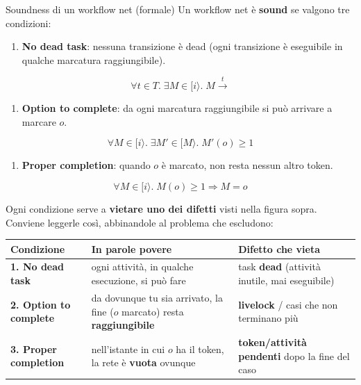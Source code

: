\begin{boxdefinition}{Soundness di un workflow net (formale)}
Un workflow net è \textbf{sound} se valgono tre condizioni:

\begin{enumerate}
\item \textbf{No dead task}: nessuna transizione è dead (ogni transizione è eseguibile in qualche marcatura raggiungibile).
\end{enumerate}

\[
\forall t \in T.\; \exists M \in [i\rangle.\; M \xrightarrow{t}
\]

\begin{enumerate}
\item \textbf{Option to complete}: da ogni marcatura raggiungibile si può arrivare a marcare $o$.
\end{enumerate}

\[
\forall M \in [i\rangle.\; \exists M' \in [M\rangle.\; M'(o) \ge 1
\]

\begin{enumerate}
\item \textbf{Proper completion}: quando $o$ è marcato, non resta nessun altro token.
\end{enumerate}

\[
\forall M \in [i\rangle.\; M(o) \ge 1 \Rightarrow M = o
\]
\end{boxdefinition}

Ogni condizione serve a \textbf{vietare uno dei difetti} visti nella figura sopra. Conviene leggerle così, abbinandole al problema che escludono:

\begingroup\small
\begin{tabularx}{\linewidth}{>{\raggedright\arraybackslash}X>{\raggedright\arraybackslash}X>{\raggedright\arraybackslash}X}
\toprule
\textbf{Condizione} & \textbf{In parole povere} & \textbf{Difetto che vieta} \\
\midrule
\textbf{1. No dead task} & ogni attività, in qualche esecuzione, si può fare & task \textbf{dead} (attività inutile, mai eseguibile) \\
\textbf{2. Option to complete} & da dovunque tu sia arrivato, la fine ($o$ marcato) resta \textbf{raggiungibile} & \textbf{livelock} / casi che non terminano più \\
\textbf{3. Proper completion} & nell'istante in cui $o$ ha il token, la rete è \textbf{vuota} ovunque & \textbf{token/attività pendenti} dopo la fine del caso \\
\bottomrule
\end{tabularx}
\endgroup


